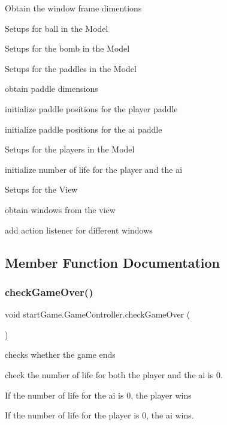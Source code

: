 Obtain the window frame dimentions

Setups for ball in the Model

Setups for the bomb in the Model

Setups for the paddles in the Model
\begin{DoxyItemize}
\item obtain paddle dimensions
\item initialize paddle positions for the player paddle
\item initialize paddle positions for the ai paddle
\end{DoxyItemize}

Setups for the players in the Model
\begin{DoxyItemize}
\item initialize number of life for the player and the ai
\end{DoxyItemize}

Setups for the View
\begin{DoxyItemize}
\item obtain windows from the view
\item add action listener for different windows
\end{DoxyItemize}

\subsection{Member Function Documentation}
\hypertarget{classstart_game_1_1_game_controller_a3e2fb04603f5a7482672b3b5d1afe568}{}\label{classstart_game_1_1_game_controller_a3e2fb04603f5a7482672b3b5d1afe568} 
\subsubsection{\texorpdfstring{check\+Game\+Over()}{checkGameOver()}}
{\footnotesize\ttfamily void start\+Game.\+Game\+Controller.\+check\+Game\+Over (\begin{DoxyParamCaption}{ }\end{DoxyParamCaption})}



checks whether the game ends 

check the number of life for both the player and the ai is 0. 
\begin{DoxyItemize}
\item If the number of life for the ai is 0, the player wins
\item If the number of life for the player is 0, the ai wins.
\end{DoxyItemize}\hypertarget{classstart_game_1_1_game_controller_abe07c8d60c3adbb0993e637b8c725884}{}\label{classstart_game_1_1_game_controller_abe07c8d60c3adbb0993e637b8c725884} 
